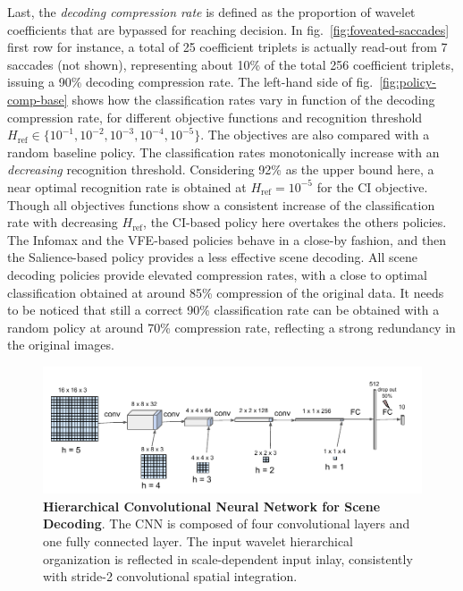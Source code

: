 \documentclass[12pt,twoside,openright]{article}
\begin{document}
Last, the \emph{decoding compression rate} is defined as the proportion of wavelet coefficients that are bypassed for reaching decision. In fig.~\ref{fig:foveated-saccades} first row for instance, a total of 25 coefficient triplets is  actually read-out from 7 saccades (not shown), representing about 10\% of the total 256 coefficient triplets, issuing a 90\% decoding compression rate. 
The left-hand side of fig.~\ref{fig:policy-comp-base} shows how the classification rates vary in function of the decoding compression rate, for different objective functions and recognition threshold $H_\text{ref} \in \{10^{-1}, 10^{-2}, 10^{-3}, 10^{-4}, 10^{-5}\}$. The objectives are also compared with a random baseline policy. The classification rates monotonically increase with an \emph{decreasing} recognition threshold. Considering 92\% as the upper bound here, a near optimal recognition rate is obtained  at $H_\text{ref}=10^{-5}$ for the CI objective. Though all objectives functions show a consistent increase of the classification rate with decreasing $H_\text{ref}$, the CI{\color{Purple}-based policy} here overtakes the others {\color{Purple}policies}. The Infomax and the VFE{\color{Purple}-based policies} behave in a close-by fashion, and then the Salience{\color{Purple}-based policy} {\color{Purple} provides a less effective scene decoding}. 
{\color{Purple} All scene decoding policies provide elevated} compression rates, with a close to optimal classification obtained at around 85\% compression of the original data. It needs to be noticed that still a correct 90\% classification rate can be obtained with a random {\color{Purple} policy} at around 70\% compression rate, reflecting a strong redundancy in the original images.  

\begin{figure}
	\centerline{
		\includegraphics[width = \linewidth]{img/frontiers-convolutional.pdf} 
	}
	\vspace{-.2cm}
	\caption{\textbf{Hierarchical Convolutional Neural Network for Scene Decoding}. The CNN is composed of four convolutional layers and one fully connected layer. The input wavelet hierarchical organization is reflected in scale-dependent input inlay, consistently with stride-2 convolutional spatial integration.  }\label{fig:CNN}
\end{figure}
\end{document}
